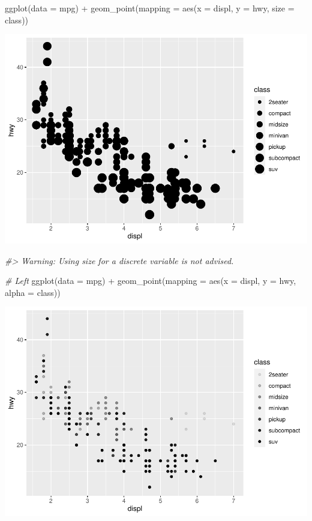 \documentclass[
]{article}
\newenvironment{Shaded}{\begin{snugshade}}{\end{snugshade}}
\newcommand{\AttributeTok}[1]{\textcolor[rgb]{0.77,0.63,0.00}{#1}}
\newcommand{\CommentTok}[1]{\textcolor[rgb]{0.56,0.35,0.01}{\textit{#1}}}
\newcommand{\FunctionTok}[1]{\textcolor[rgb]{0.00,0.00,0.00}{#1}}
\newcommand{\NormalTok}[1]{#1}
\newcommand{\SpecialCharTok}[1]{\textcolor[rgb]{0.00,0.00,0.00}{#1}}
\begin{document}
\begin{Shaded}
\begin{Highlighting}[]
\FunctionTok{ggplot}\NormalTok{(}\AttributeTok{data =}\NormalTok{ mpg) }\SpecialCharTok{+} 
  \FunctionTok{geom\_point}\NormalTok{(}\AttributeTok{mapping =} \FunctionTok{aes}\NormalTok{(}\AttributeTok{x =}\NormalTok{ displ, }\AttributeTok{y =}\NormalTok{ hwy, }\AttributeTok{size =}\NormalTok{ class))}
\end{Highlighting}
\end{Shaded}

\includegraphics{Journal_files/figure-latex/unnamed-chunk-45-2.pdf}

\begin{Shaded}
\begin{Highlighting}[]
\CommentTok{\#\textgreater{} Warning: Using size for a discrete variable is not advised.}

\CommentTok{\# Left}
\FunctionTok{ggplot}\NormalTok{(}\AttributeTok{data =}\NormalTok{ mpg) }\SpecialCharTok{+} 
  \FunctionTok{geom\_point}\NormalTok{(}\AttributeTok{mapping =} \FunctionTok{aes}\NormalTok{(}\AttributeTok{x =}\NormalTok{ displ, }\AttributeTok{y =}\NormalTok{ hwy, }\AttributeTok{alpha =}\NormalTok{ class))}
\end{Highlighting}
\end{Shaded}

\includegraphics{Journal_files/figure-latex/unnamed-chunk-45-3.pdf}
\end{document}
